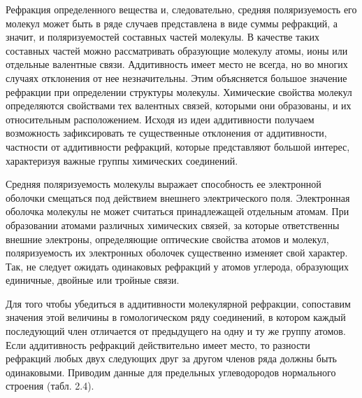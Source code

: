 Рефракция определенного вещества и, следовательно, средняя
поляризуемость его молекул может быть в ряде случаев
представлена в виде суммы рефракций, а значит, и поляризуемостей
составных частей молекулы. В качестве таких составных частей можно
рассматривать образующие молекулу атомы, ионы или отдельные
валентные связи. Аддитивность имеет место не всегда, но во многих
случаях отклонения от нее незначительны. Этим объясняется большое
значение рефракции при определении структуры молекулы. Химические
свойства молекул определяются свойствами тех валентных связей,
которыми они образованы, и их относительным расположением. Исходя
из идеи аддитивности получаем возможность зафиксировать те
существенные отклонения от аддитивности, частности от
аддитивности рефракций, которые представляют большой интерес,
характеризуя важные группы химических соединений.

Средняя поляризуемость молекулы выражает способность ее
электронной оболочки смещаться под действием внешнего
электрического поля. Электронная оболочка молекулы не может
считаться принадлежащей отдельным атомам. При образовании атомами
различных химических связей, за которые ответственны внешние
электроны, определяющие оптические свойства атомов и молекул,
поляризуемость их электронных оболочек существенно изменяет свой
характер. Так, не следует ожидать одинаковых рефракций у атомов
углерода, образующих единичные, двойные или тройные связи.

Для того чтобы убедиться в аддитивности молекулярной рефракции,
сопоставим значения этой величины в гомологическом ряду
соединений, в котором каждый последующий член отличается от
предыдущего на одну и ту же группу атомов. Если аддитивность
рефракций действительно имеет место, то разности рефракций любых
двух следующих друг за другом членов ряда должны быть одинаковыми.
Приводим данные для предельных углеводородов нормального строения
(табл. 2.4). 
\begin{figure}[tbp]

\hbox{\vbox{}} 
\end{figure}

